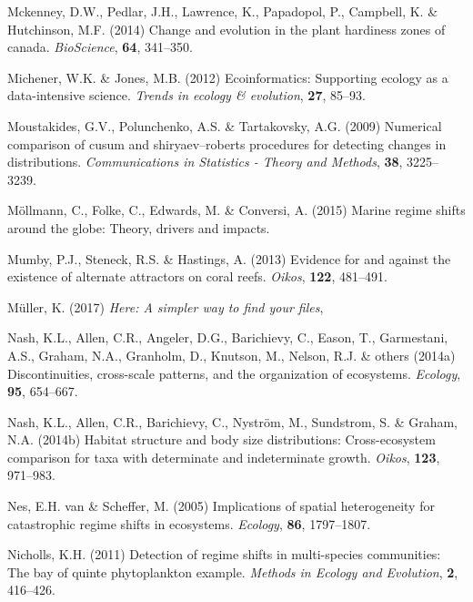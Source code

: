 \documentclass[print]{nuthesis}
\begin{document}
\leavevmode\hypertarget{ref-mckenney2014change}{}%
Mckenney, D.W., Pedlar, J.H., Lawrence, K., Papadopol, P., Campbell, K. \& Hutchinson, M.F. (2014) Change and evolution in the plant hardiness zones of canada. \emph{BioScience}, \textbf{64}, 341--350.

\leavevmode\hypertarget{ref-michener2012ecoinformatics}{}%
Michener, W.K. \& Jones, M.B. (2012) Ecoinformatics: Supporting ecology as a data-intensive science. \emph{Trends in ecology \& evolution}, \textbf{27}, 85--93.

\leavevmode\hypertarget{ref-moustakides2009numerical}{}%
Moustakides, G.V., Polunchenko, A.S. \& Tartakovsky, A.G. (2009) Numerical comparison of cusum and shiryaev--roberts procedures for detecting changes in distributions. \emph{Communications in Statistics - Theory and Methods}, \textbf{38}, 3225--3239.

\leavevmode\hypertarget{ref-mollmann2015marine}{}%
Möllmann, C., Folke, C., Edwards, M. \& Conversi, A. (2015) Marine regime shifts around the globe: Theory, drivers and impacts.

\leavevmode\hypertarget{ref-mumby2013evidence}{}%
Mumby, P.J., Steneck, R.S. \& Hastings, A. (2013) Evidence for and against the existence of alternate attractors on coral reefs. \emph{Oikos}, \textbf{122}, 481--491.

\leavevmode\hypertarget{ref-here}{}%
Müller, K. (2017) \emph{Here: A simpler way to find your files},

\leavevmode\hypertarget{ref-nash2014discontinuities}{}%
Nash, K.L., Allen, C.R., Angeler, D.G., Barichievy, C., Eason, T., Garmestani, A.S., Graham, N.A., Granholm, D., Knutson, M., Nelson, R.J. \& others (2014a) Discontinuities, cross-scale patterns, and the organization of ecosystems. \emph{Ecology}, \textbf{95}, 654--667.

\leavevmode\hypertarget{ref-nash2014habitat}{}%
Nash, K.L., Allen, C.R., Barichievy, C., Nyström, M., Sundstrom, S. \& Graham, N.A. (2014b) Habitat structure and body size distributions: Cross-ecosystem comparison for taxa with determinate and indeterminate growth. \emph{Oikos}, \textbf{123}, 971--983.

\leavevmode\hypertarget{ref-van2005implications}{}%
Nes, E.H. van \& Scheffer, M. (2005) Implications of spatial heterogeneity for catastrophic regime shifts in ecosystems. \emph{Ecology}, \textbf{86}, 1797--1807.

\leavevmode\hypertarget{ref-nicholls_detection_2011}{}%
Nicholls, K.H. (2011) Detection of regime shifts in multi-species communities: The bay of quinte phytoplankton example. \emph{Methods in Ecology and Evolution}, \textbf{2}, 416--426.
\end{document}
